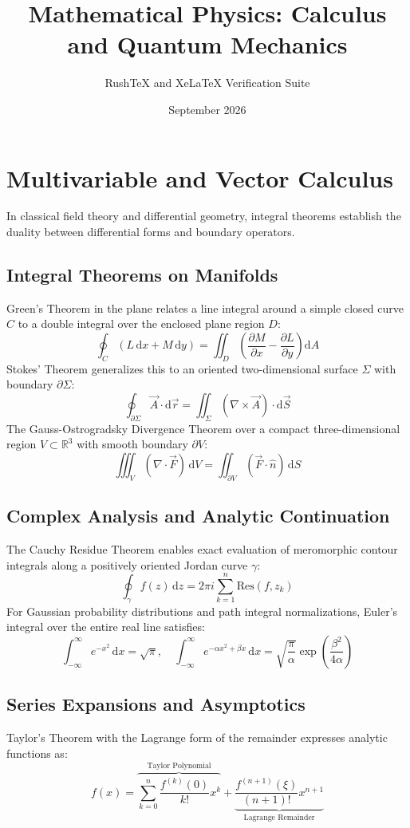 \documentclass{article}
\title{Mathematical Physics: Calculus and Quantum Mechanics}
\author{RushTeX and XeLaTeX Verification Suite}
\date{September 2026}
\begin{document}
\maketitle

\section{Multivariable and Vector Calculus}

In classical field theory and differential geometry, integral theorems establish the duality between differential forms and boundary operators.

\subsection{Integral Theorems on Manifolds}
Green's Theorem in the plane relates a line integral around a simple closed curve $C$ to a double integral over the enclosed plane region $D$:
\[
\oint_C (L\,\mathrm{d}x + M\,\mathrm{d}y) = \iint_D \left( \frac{\partial M}{\partial x} - \frac{\partial L}{\partial y} \right) \mathrm{d}A
\]
Stokes' Theorem generalizes this to an oriented two-dimensional surface $\Sigma$ with boundary $\partial \Sigma$:
\[
\oint_{\partial \Sigma} \vec{A} \cdot \mathrm{d}\vec{r} = \iint_\Sigma (\nabla \times \vec{A}) \cdot \mathrm{d}\vec{S}
\]
The Gauss-Ostrogradsky Divergence Theorem over a compact three-dimensional region $V \subset \mathbb{R}^3$ with smooth boundary $\partial V$:
\[
\iiint_V (\nabla \cdot \vec{F})\,\mathrm{d}V = \iint_{\partial V} (\vec{F} \cdot \hat{n})\,\mathrm{d}S
\]

\subsection{Complex Analysis and Analytic Continuation}
The Cauchy Residue Theorem enables exact evaluation of meromorphic contour integrals along a positively oriented Jordan curve $\gamma$:
\[
\oint_\gamma f(z)\,\mathrm{d}z = 2\pi i \sum_{k=1}^n \mathrm{Res}(f, z_k)
\]
For Gaussian probability distributions and path integral normalizations, Euler's integral over the entire real line satisfies:
\[
\int_{-\infty}^\infty e^{-x^2}\,\mathrm{d}x = \sqrt{\pi}, \quad \int_{-\infty}^\infty e^{-\alpha x^2 + \beta x}\,\mathrm{d}x = \sqrt{\frac{\pi}{\alpha}} \exp\left( \frac{\beta^2}{4\alpha} \right)
\]

\subsection{Series Expansions and Asymptotics}
Taylor's Theorem with the Lagrange form of the remainder expresses analytic functions as:
\[
f(x) = \overbrace{\sum_{k=0}^n \frac{f^{(k)}(0)}{k!} x^k}^{\text{Taylor Polynomial}} + \underbrace{\frac{f^{(n+1)}(\xi)}{(n+1)!} x^{n+1}}_{\text{Lagrange Remainder}}
\]
\end{document}

